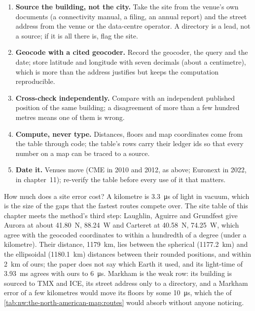\begin{method}\label{met:nw:the-north-american-map:table}
\begin{enumerate}
\item \textbf{Source the building, not the city.} Take the site from the venue's own documents (a connectivity manual, a filing, an annual report)
  and the street address from the venue or the data-centre operator. A directory is a lead, not a source; if it is all there is, flag the site.
\item \textbf{Geocode with a cited geocoder.} Record the geocoder, the query and the date; store latitude and longitude with seven decimals
  (about a centimetre), which is more than the address justifies but keeps the computation reproducible.
\item \textbf{Cross-check independently.} Compare with an independent published position of the same building; a disagreement of more than a
  few hundred metres means one of them is wrong.
\item \textbf{Compute, never type.} Distances, floors and map coordinates come from the table through code; the table's rows carry their ledger
  ids so that every number on a map can be traced to a source.
\item \textbf{Date it.} Venues move (CME in 2010 and 2012, as above; Euronext in 2022, in chapter~11); re-verify the table before every use
  of it that matters.
\end{enumerate}
\end{method}

How much does a site error cost? A kilometre is \qty{3.3}{\micro\second} of light in vacuum, which is the size of the gaps that the fastest
routes compete over. The site table of this chapter meets the method's third step: Laughlin, Aguirre and Grundfest give Aurora at about
41.80\textdegree{}~N, 88.24\textdegree{}~W and Carteret at 40.58\textdegree{}~N, 74.25\textdegree{}~W, which agree with the geocoded coordinates to
within a hundredth of a degree (under a kilometre). Their distance, \qty{1179}{\kilo\metre}, lies between the spherical (\qty{1177.2}{\kilo\metre}) and the ellipsoidal
(\qty{1180.1}{\kilo\metre}) distances between their rounded positions, and within \qty{2}{\kilo\metre} of ours; the paper does not say which
Earth it used, and its light-time of \qty{3.93}{\milli\second} agrees with ours to \qty{6}{\micro\second}. Markham is the weak row: its
building is sourced to TMX and ICE, its street address only to a directory, and a Markham error of a few kilometres would move its floors by
some \qty{10}{\micro\second}, which the  of \cref{tab:nw:the-north-american-map:routes} would absorb without anyone noticing.

